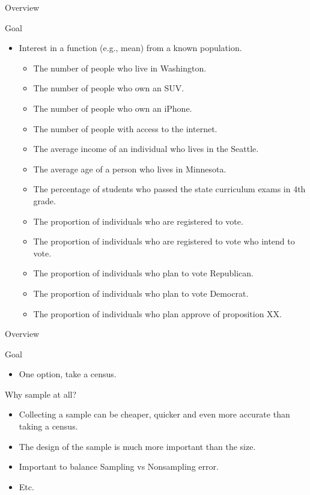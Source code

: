 \documentclass[10pt]{beamer}\usepackage[]{graphicx}\usepackage[]{xcolor}
\begin{document}
\begin{frame}{Overview}

\begin{block}{Goal}
\begin{itemize}
\item Interest in a function (e.g., mean) from a known population.

\begin{itemize}
\item The number of people who live in Washington.
\item The number of people who own an SUV.
\item The number of people who own an iPhone.
\item The number of people with access to the internet.
\item The average income of an individual who lives in the Seattle.
\item The average age of a person who lives in Minnesota.
\item The percentage of students who passed the state curriculum exams in 4th grade.
\item The proportion of individuals who are registered to vote.
\item The proportion of individuals who are registered to vote who intend to vote.
\item The proportion of individuals who plan to vote Republican.
\item The proportion of individuals who plan to vote Democrat.
\item The proportion of individuals who plan approve of proposition XX.
\end{itemize}

\end{itemize}
\end{block}

\end{frame}

\begin{frame}{Overview}

\begin{block}{Goal}
\begin{itemize}
\item One option, take a census. 
\end{itemize}
\end{block}

\end{frame}

\begin{frame}{Why sample at all?}

\begin{block}{}
\begin{itemize}
\item Collecting a sample can be cheaper, quicker and even more accurate than
taking a census.
\item The design of the sample is much more important than the size.
\item Important to balance Sampling vs Nonsampling error.
\item Etc.
\end{itemize}
\end{block}
\end{frame}
\end{document}
